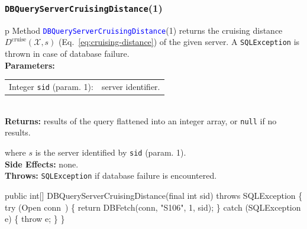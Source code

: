 \documentclass{article}
\def\nwendcode{\endtrivlist \endgroup}      %
\let\nwdocspar=\par
\theoremstyle{definition}                   %
\begin{document}
\subsubsection{{\tt{}\protect{}DBQueryServerCruisingDistance}(1)}
\begin{tabular}{p{\textwidth}}
\toprule
{}
Method \textcolor{blue}{{\tt{}\protect{}DBQueryServerCruisingDistance}}(1) returns the
cruising distance $D^\textrm{cruise}(\mathcal{X},s)$
(Eq.~\ref{eq:cruising-distance}) of the given server.
A {\tt{}SQLException} is thrown in case of database failure.\\
\midrule
\textbf{Parameters:}\\
\begin{tabular}{lp{116mm}}
Integer {\tt{}sid} (param. 1):&server identifier.
\end{tabular}\\
\textbf{Returns:} results of the query flattened into an integer array,
or {\tt{}null} if no results.


where $s$ is the server identified by {\tt{}sid} (param. 1).\\
\textbf{Side Effects:} none.\\
\textbf{Throws:} {\tt{}SQLException} if database failure is encountered.\\
\bottomrule
\end{tabular}
\nwenddocs{}\plusendmoddef
public int[] DBQueryServerCruisingDistance(final int sid) throws SQLException \{
  try (\LA{}Open \code{}conn\edoc{}~{\nwtagstyle{}}\RA{}) \{
    return DBFetch(conn, "S106", 1, sid);
  \} catch (SQLException e) \{
    throw e;
  \}
\}
\eatline
{}\nwendcode{}\nwdocspar
\end{document}
